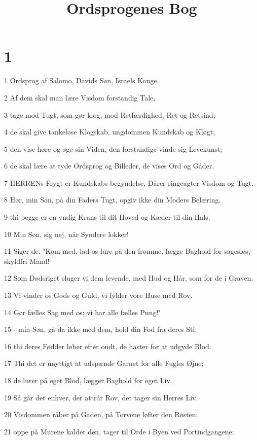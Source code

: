

\title{Ordsprogenes Bog}


\chapter{1}

\par 1 Ordsprog af Salomo, Davids Søn, Israels Konge.
\par 2 Af dem skal man lære Visdom forstandig Tale,
\par 3 tage mod Tugt, som gør klog, mod Retfærdighed, Ret og Retsind;
\par 4 de skal give tankeløse Klogskab, ungdommen Kundskab og Kløgt;
\par 5 den vise høre og øge sin Viden, den forstandige vinde sig Levekunst;
\par 6 de skal lære at tyde Ordsprog og Billeder, de vises Ord og Gåder.
\par 7 HERRENs Frygt er Kundskabs begyndelse, Dårer ringeagter Visdom og Tugt.
\par 8 Hør, min Søn, på din Faders Tugt, opgiv ikke din Moders Belæring.
\par 9 thi begge er en yndig Krans til dit Hoved og Kæder til din Hals.
\par 10 Min Søn, sig nej, når Syndere lokker!
\par 11 Siger de: "Kom med, lad os lure på den fromme, lægge Baghold for sagesløs, skyldfri Mand!
\par 12 Som Dødsriget sluger vi dem levende, med Hud og Hår, som for de i Graven.
\par 13 Vi vinder os Gods og Guld, vi fylder vore Huse med Rov.
\par 14 Gør fælles Sag med os; vi har alle fælles Pung!"
\par 15 - min Søn, gå da ikke med dem, hold din Fod fra deres Sti;
\par 16 thi deres Fødder løber efter ondt, de haster for at udgyde Blod.
\par 17 Thi det er unyttigt at udspænde Garnet for alle Fugles Øjne;
\par 18 de lurer på eget Blod, lægger Baghold for eget Liv.
\par 19 Så går det enhver, der attrår Rov, det tager sin Herres Liv.
\par 20 Visdommen råber på Gaden, på Torvene løfter den Røsten;
\par 21 oppe på Murene kalder den, tager til Orde i Byen ved Portindgangene:
